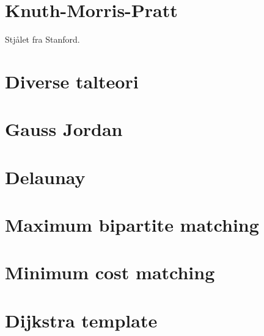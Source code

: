 \documentclass[a4paper,final,8pt]{article}
\begin{document}


\section{Knuth-Morris-Pratt}

Stjålet fra Stanford.



\section{Diverse talteori}



\section{Gauss Jordan}



\section{Delaunay}



\section{Maximum bipartite matching}



\section{Minimum cost matching}



\section{Dijkstra template}
\end{document}
